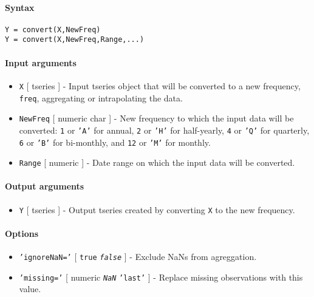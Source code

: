 


	\paragraph{Syntax}\label{syntax}

\begin{verbatim}
Y = convert(X,NewFreq)
Y = convert(X,NewFreq,Range,...)
\end{verbatim}

\paragraph{Input arguments}\label{input-arguments}

\begin{itemize}
\item
  \texttt{X} {[} tseries {]} - Input tseries object that will be
  converted to a new frequency, \texttt{freq}, aggregating or
  intrapolating the data.
\item
  \texttt{NewFreq} {[} numeric \textbar{} char {]} - New frequency to
  which the input data will be converted: \texttt{1} or \texttt{'A'} for
  annual, \texttt{2} or \texttt{'H'} for half-yearly, \texttt{4} or
  \texttt{'Q'} for quarterly, \texttt{6} or \texttt{'B'} for bi-monthly,
  and \texttt{12} or \texttt{'M'} for monthly.
\item
  \texttt{Range} {[} numeric {]} - Date range on which the input data
  will be converted.
\end{itemize}

\paragraph{Output arguments}\label{output-arguments}

\begin{itemize}
\itemsep1pt\parskip0pt
\item
  \texttt{Y} {[} tseries {]} - Output tseries created by converting
  \texttt{X} to the new frequency.
\end{itemize}

\paragraph{Options}\label{options}

\begin{itemize}
\item
  \texttt{'ignoreNaN='} {[} \texttt{true} \textbar{}
  \emph{\texttt{false}} {]} - Exclude NaNs from agreggation.
\item
  \texttt{'missing='} {[} numeric \textbar{} \emph{\texttt{NaN}}
  \textbar{} \texttt{'last'} {]} - Replace missing observations with
  this value.
\end{itemize}


